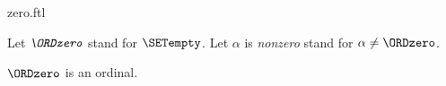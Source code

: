 \documentclass{stex}
\begin{document}
\begin{smodule}{zero.ftl}

\begin{convention}[forthel]
  Let $\emph{\ORDzero}$ stand for $\SETempty$.
  Let $\alpha$ is \emph{nonzero} stand for $\alpha \neq \ORDzero$.
\end{convention}

\begin{proposition}[forthel]
  $\ORDzero$ is an ordinal.
\end{proposition}
\end{smodule}
\end{document}
